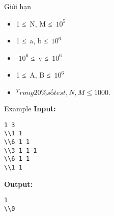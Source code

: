 Giới hạn  
\begin{itemize}
	\item     1 ≤ N, M ≤ $10^{5}$
	\item     1 ≤ a, b ≤ $10^{6}$
	\item     -$10^{6}$    ≤ v ≤ $10^{6}$
	\item     1 ≤ A, B ≤ $10^{6}$
	\item $^     Trong 20\% số test, N, M ≤ 1000.    $
\end{itemize}
   Example  
\textbf{    Input:   }
\begin{verbatim}
1 3
\\1 1
\\6 1 1 
\\3 1 1 1 
\\6 1 1
\\1 1\end{verbatim}

\textbf{    Output:   }
\begin{verbatim}
1
\\0\end{verbatim}